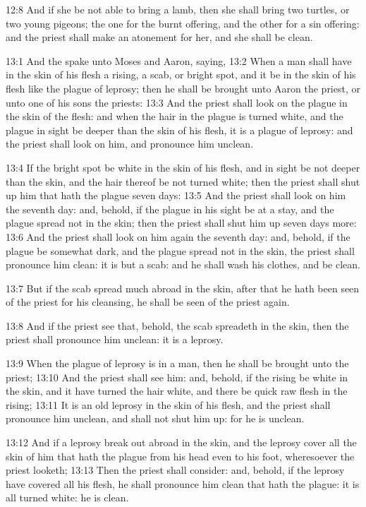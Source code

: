 12:8 And if she be not able to bring a lamb, then she shall bring two
turtles, or two young pigeons; the one for the burnt offering, and the
other for a sin offering: and the priest shall make an atonement for
her, and she shall be clean.

13:1 And the \LORD spake unto Moses and Aaron, saying, 13:2 When a man
shall have in the skin of his flesh a rising, a scab, or bright spot,
and it be in the skin of his flesh like the plague of leprosy; then he
shall be brought unto Aaron the priest, or unto one of his sons the
priests: 13:3 And the priest shall look on the plague in the skin of
the flesh: and when the hair in the plague is turned white, and the
plague in sight be deeper than the skin of his flesh, it is a plague
of leprosy: and the priest shall look on him, and pronounce him
unclean.

13:4 If the bright spot be white in the skin of his flesh, and in
sight be not deeper than the skin, and the hair thereof be not turned
white; then the priest shall shut up him that hath the plague seven
days: 13:5 And the priest shall look on him the seventh day: and,
behold, if the plague in his sight be at a stay, and the plague spread
not in the skin; then the priest shall shut him up seven days more:
13:6 And the priest shall look on him again the seventh day: and,
behold, if the plague be somewhat dark, and the plague spread not in
the skin, the priest shall pronounce him clean: it is but a scab: and
he shall wash his clothes, and be clean.

13:7 But if the scab spread much abroad in the skin, after that he
hath been seen of the priest for his cleansing, he shall be seen of
the priest again.

13:8 And if the priest see that, behold, the scab spreadeth in the
skin, then the priest shall pronounce him unclean: it is a leprosy.

13:9 When the plague of leprosy is in a man, then he shall be brought
unto the priest; 13:10 And the priest shall see him: and, behold, if
the rising be white in the skin, and it have turned the hair white,
and there be quick raw flesh in the rising; 13:11 It is an old leprosy
in the skin of his flesh, and the priest shall pronounce him unclean,
and shall not shut him up: for he is unclean.

13:12 And if a leprosy break out abroad in the skin, and the leprosy
cover all the skin of him that hath the plague from his head even to
his foot, wheresoever the priest looketh; 13:13 Then the priest shall
consider: and, behold, if the leprosy have covered all his flesh, he
shall pronounce him clean that hath the plague: it is all turned
white: he is clean.

